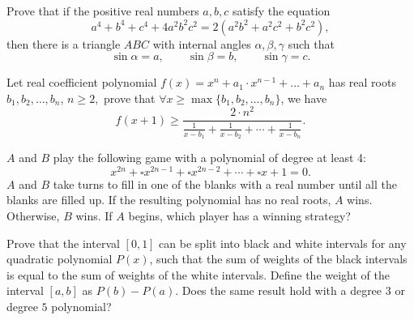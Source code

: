 \documentclass[12pt,a4paper]{memoir}
\theoremstyle{definition}
\begin{document}
\begin{question}[name={2014 Czech and Slovak}]
	Prove that if the positive real numbers $a, b, c$ satisfy the equation
	\[a^4 + b^4 + c^4 + 4a^2b^2c^2 = 2 (a^2b^2 + a^2c^2 + b^2c^2),\]
	then there is a triangle $ABC$ with internal angles $\alpha, \beta, \gamma$ such that
	\[\sin \alpha = a, \qquad \sin \beta = b, \qquad \sin  \gamma= c.\]
\end{question}



\begin{question}[name={1991 China TST}]
	Let real coefficient polynomial $f(x) = x^n + a_1 \cdot x^{n-1} + \ldots + a_n$ has real roots $b_1, b_2, \dots, b_n$, $n \geq 2,$ prove that $\forall x \geq \max\{b_1, b_2, \ldots, b_n\}$, we have
	\[f(x+1) \geq \frac{2 \cdot n^2}{\displaystyle \frac{1}{x-b_1} + \frac{1}{x-b_2} + \cdots + \frac{1}{x-b_n}}.\]
\end{question}



\begin{question}[name={1995 China TST}]
	$ A$ and $ B$ play the following game with a polynomial of degree at least 4: \[ x^{2n} + \square x^{2n - 1} +  \square x^{2n - 2} + \cdots + \square x + 1 = 0.\]
	$A$ and $B$ take turns to fill in one of the blanks with a real number until all the blanks are filled up. If the resulting polynomial has no real roots, $A$ wins. Otherwise, $B$ wins. If $A$ begins, which player has a winning strategy?
\end{question}



\begin{question}[name={1995 China TST}]
	Prove that the interval $[0,1]$ can be split into black and white intervals for any quadratic polynomial $P(x)$, such that the sum of weights of the black intervals is equal to the sum of weights of the white intervals. Define the weight of the interval $[a,b]$ as $P(b) - P(a)$. Does the same result hold with a degree $3$ or degree $5$ polynomial?
\end{question}
\end{document}
